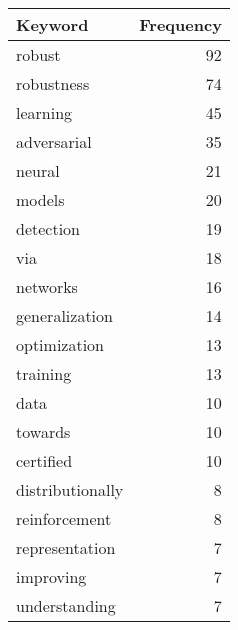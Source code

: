 \begin{tabular}{|l|r|}
    \toprule
             Keyword &  Frequency \\
    \midrule
              robust &         92 \\
          robustness &         74 \\
            learning &         45 \\
         adversarial &         35 \\
              neural &         21 \\
              models &         20 \\
           detection &         19 \\
                 via &         18 \\
            networks &         16 \\
      generalization &         14 \\
        optimization &         13 \\
            training &         13 \\
                data &         10 \\
             towards &         10 \\
           certified &         10 \\
    distributionally &          8 \\
       reinforcement &          8 \\
      representation &          7 \\
           improving &          7 \\
       understanding &          7 \\
    \bottomrule
    \end{tabular}
    